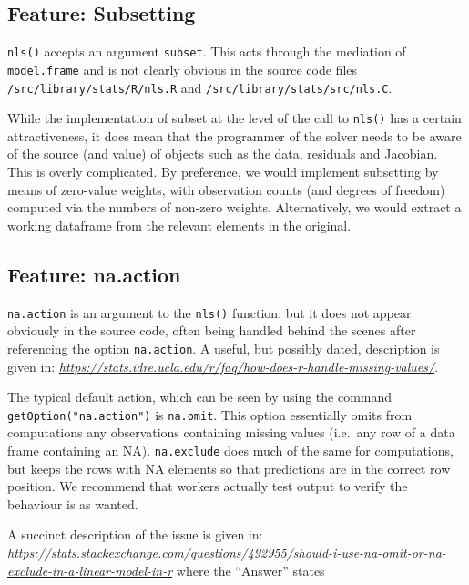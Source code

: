\hypertarget{feature-subsetting}{%
\subsection{Feature: Subsetting}\label{feature-subsetting}}

\texttt{nls()} accepts an argument \texttt{subset}. This acts through the mediation of
\texttt{model.frame} and is not clearly obvious in the source code files
\texttt{/src/library/stats/R/nls.R} and \texttt{/src/library/stats/src/nls.C}.

While the implementation of subset at the level of the call to \texttt{nls()} has a certain
attractiveness, it does mean that the programmer of the solver needs to be aware of
the source (and value) of objects such as the data, residuals and Jacobian. This
is overly complicated. By preference,
we would implement subsetting by means of zero-value weights, with observation counts
(and degrees of freedom) computed via the numbers of non-zero weights. Alternatively,
we would extract a working dataframe from the relevant elements in the original.

\hypertarget{feature-na.action}{%
\subsection{Feature: na.action}\label{feature-na.action}}

\texttt{na.action} is an argument to the \texttt{nls()} function, but it does not appear obviously
in the source code, often being handled behind the scenes after referencing the
option \texttt{na.action}. A useful, but possibly dated, description is given in:
\emph{\url{https://stats.idre.ucla.edu/r/faq/how-does-r-handle-missing-values/}}.

The typical default action, which can be seen by using the command
\texttt{getOption("na.action")}
is \texttt{na.omit}. This option essentially omits from computations any observations
containing missing values (i.e.~any row of a data frame containing an NA).
\texttt{na.exclude} does much of the same for computations, but keeps the rows with NA
elements so that predictions are in the correct row position. We recommend that
workers actually test output to verify the behaviour is as wanted.

A succinct description of the issue is given in: \emph{\url{https://stats.stackexchange.com/questions/492955/should-i-use-na-omit-or-na-exclude-in-a-linear-model-in-r}}
where the ``Answer'' states

